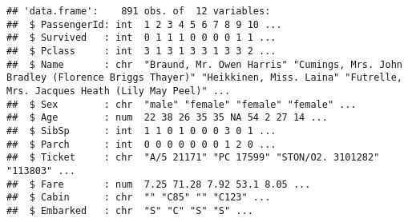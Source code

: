 \documentclass[
]{article}
\begin{document}
\begin{verbatim}
## 'data.frame':    891 obs. of  12 variables:
##  $ PassengerId: int  1 2 3 4 5 6 7 8 9 10 ...
##  $ Survived   : int  0 1 1 1 0 0 0 0 1 1 ...
##  $ Pclass     : int  3 1 3 1 3 3 1 3 3 2 ...
##  $ Name       : chr  "Braund, Mr. Owen Harris" "Cumings, Mrs. John Bradley (Florence Briggs Thayer)" "Heikkinen, Miss. Laina" "Futrelle, Mrs. Jacques Heath (Lily May Peel)" ...
##  $ Sex        : chr  "male" "female" "female" "female" ...
##  $ Age        : num  22 38 26 35 35 NA 54 2 27 14 ...
##  $ SibSp      : int  1 1 0 1 0 0 0 3 0 1 ...
##  $ Parch      : int  0 0 0 0 0 0 0 1 2 0 ...
##  $ Ticket     : chr  "A/5 21171" "PC 17599" "STON/O2. 3101282" "113803" ...
##  $ Fare       : num  7.25 71.28 7.92 53.1 8.05 ...
##  $ Cabin      : chr  "" "C85" "" "C123" ...
##  $ Embarked   : chr  "S" "C" "S" "S" ...
\end{verbatim}
\end{document}
